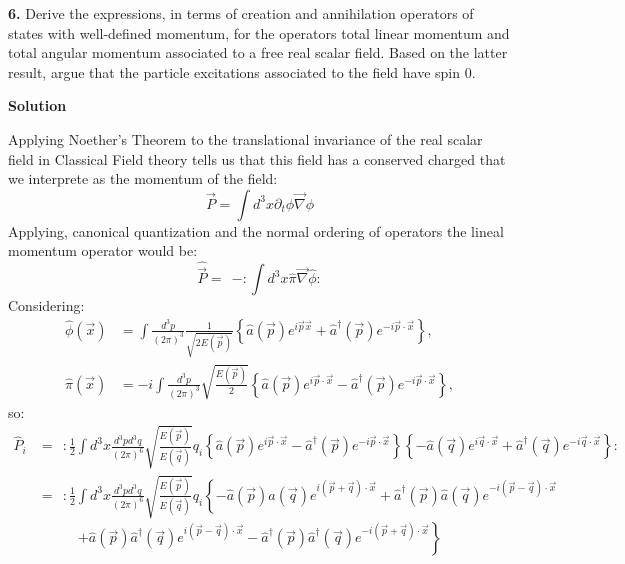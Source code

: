 \documentclass[12pt]{article}
\begin{document}
\pagestyle{fancy}

\textbf{6.} Derive the expressions, in terms of creation and annihilation operators of states with well-defined momentum, for the operators total linear momentum and total angular momentum associated to a free real scalar field. Based on the latter result, argue that the particle excitations associated to the field have spin 0.

\color{blue}

\textbf{Solution}

Applying Noether's Theorem to the translational invariance of the real scalar field in Classical Field theory tells us that this field has a conserved charged that we interprete as the momentum of the field:
\[
    \vec{P} = \int d^3x \partial_t \phi \vec{\nabla} \phi
\]
Applying, canonical quantization and the normal ordering of operators the lineal momentum operator would be:
\[
    \hat{ \vec{P} } = ~~ - :\int d^3x \hat{\pi} \vec{\nabla}\hat{\phi}:
\]
Considering:
\[
    \begin{aligned}
        \hat{ \phi }(\vec{x}) &= \int \frac{d^3p}{(2\pi)^3}\frac{1}{\sqrt{2E(\vec{p})}}\left\{\hat{a}(\vec{p})e^{i\vec{p} \vec{x}} + \hat{a}^\dagger(\vec{p})e^{-i\vec{p} \cdot \vec{x}}\right\}, \\
        \hat{ \pi }(\vec{x}) &= -i \int \frac{d^3p}{(2\pi)^3}\sqrt{\frac{E(\vec{p})}{2}}\left\{\hat{a}(\vec{p})e^{i\vec{p} \cdot \vec{x}} - \hat{a}^\dagger(\vec{p})e^{-i\vec{p} \cdot \vec{x}}\right\},
    \end{aligned}
\]
so:
\[
    \begin{aligned}
        \hat{ P }_i &= ~~ :\frac{1}{2}\int d^3x \frac{d^3pd^3q}{(2\pi)^6} \sqrt{\frac{E(\vec{p})}{E(\vec{q})}}q_i\left\{\hat{a}(\vec{p})e^{i\vec{p}\cdot \vec{x}} - \hat{a}^\dagger(\vec{p})e^{-i\vec{p} \cdot \vec{x}}\right\}\left\{-\hat{a}(\vec{q})e^{i\vec{q} \cdot \vec{x}} + \hat{a}^\dagger(\vec{q})e^{-i\vec{q} \cdot \vec{x}}\right\}: \\
        &= ~~ :\frac{1}{2}\int d^3x \frac{d^3pd^3q}{(2\pi)^6}\sqrt{\frac{E(\vec{p})}{E(\vec{q})}} q_i\left\{-\hat{a}(\vec{p})\hat{a}(\vec{q})e^{i(\vec{p}+\vec{q})\cdot \vec{x}} + \hat{a}^\dagger(\vec{p})\hat{a}(\vec{q})e^{-i(\vec{p}-\vec{q}) \cdot \vec{x}}\right.
    \end{aligned}
\]
\[
    \left.+\hat{a}(\vec{p})\hat{a}^\dagger(\vec{q})e^{i(\vec{p}-\vec{q}) \cdot \vec{x}}-\hat{a}^\dagger(\vec{p})\hat{a}^\dagger(\vec{q})e^{-i(\vec{p}+\vec{q}) \cdot \vec{x}}\right\}
\]
\end{document}

